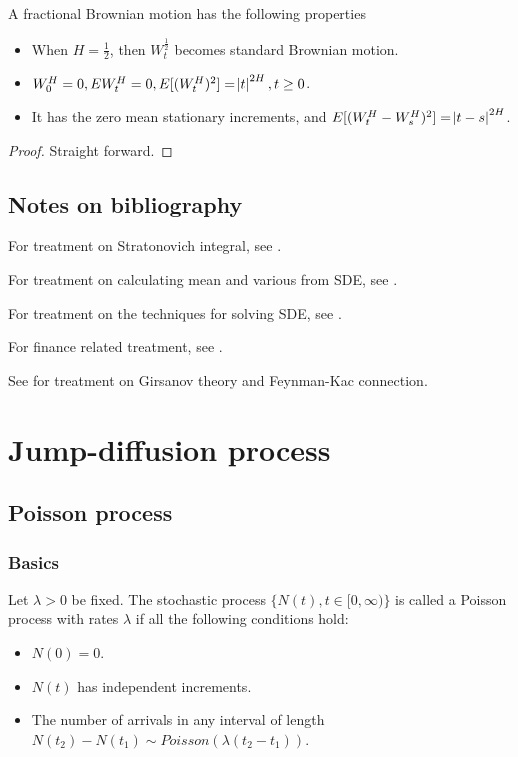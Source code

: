 \begin{refsection}
\begin{lemma}\cite[17]{pavliotis2014stochastic}
	A fractional Brownian motion has the following properties
	\begin{itemize}
		\item When $H = \frac{1}{2}$, then $W_t^{\frac{1}{2}}$ becomes standard Brownian motion.
		\item $W_0^H = 0, EW_t^H = 0, E[(W_t^H)^2] = \abs{t}^{2H},t\geq 0$.
		\item It has the zero mean stationary increments, and $E[(W_t^H - W_s^H)^2] = \abs{t-s}^{2H}$.
	\end{itemize}
\end{lemma}
\begin{proof}
	Straight forward.
\end{proof}

\section{Notes on bibliography}

	
	For treatment on Stratonovich integral, see \cite{mikosch1998elementary}.
	
	
	For treatment on calculating mean and various from SDE, see \cite{calin2012introduction}.
	
	For treatment on the techniques for solving SDE, see \cite{calin2012introduction}\cite{mikosch1998elementary}\cite{wiersema2008brownian}. 
	
	For finance related treatment, see \cite{wiersema2008brownian}.
	
	See \cite{steele2001stochastic} for treatment on Girsanov theory and Feynman-Kac connection.
	
	

	\chapter{Jump-diffusion process}\label{ch:theory-of-stochastic-process}
	\minitoc
	
	
	
	
	
\section{Poisson process}
\subsection{Basics}
\begin{definition}
	Let $\lambda > 0$ be fixed. The stochastic process $\{N(t),t\in [0,\infty)\}$ is called a Poisson process with rates $\lambda$ if all the following conditions hold:
	\begin{itemize}
		\item $N(0) = 0$.
		\item $N(t)$ has independent increments.
		\item The number of arrivals in any interval of length $N(t_2)-N(t_1)\sim Poisson(\lambda(t_2-t_1))$.
	\end{itemize}
\end{definition}



\end{refsection}
